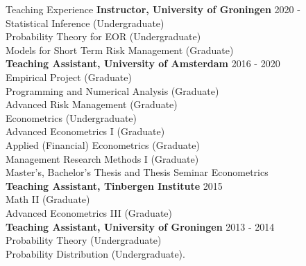 \documentclass{resume} %
\begin{document}
\begin{rSection}{Teaching Experience}
	\textbf{Instructor, 	University of Groningen}
 \hfill 2020 - ~~~~~~ \\
	Statistical Inference (Undergraduate) \\	
	Probability Theory for EOR (Undergraduate) \\
	Models for Short Term Risk Management (Graduate) \\
	
	\textbf{Teaching Assistant, University of Amsterdam} \hfill 2016 - 2020 \\ 
Empirical Project (Graduate)\\
Programming and Numerical Analysis (Graduate)\\
Advanced Risk Management (Graduate)\\
Econometrics (Undergraduate)\\
Advanced Econometrics I (Graduate)\\ 
Applied (Financial) Econometrics (Graduate)\\
Management Research Methods I (Graduate)\\
	Master's, Bachelor’s Thesis and Thesis Seminar Econometrics \\
	
\textbf{Teaching Assistant, Tinbergen Institute} \hfill 2015 ~~~~~~~~ \\ 
	Math II (Graduate)\\
	Advanced Econometrics III (Graduate)\\
	
\textbf{Teaching Assistant, University of Groningen}\hfill	
	2013 - 2014  \\
	Probability Theory (Undergraduate)\\
	Probability Distribution (Undergraduate).
\end{rSection}
	 

  
\end{document}

